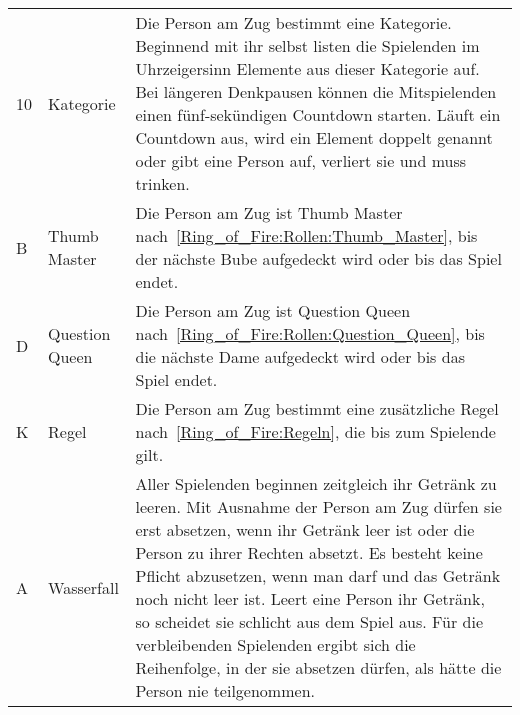 \begin{enumerate}[label={(\arabic*)}]
\begin{tabulary}{\textwidth}{llL}
		10 & Kategorie      & Die Person am Zug bestimmt eine Kategorie.
		Beginnend mit ihr selbst listen die Spielenden im Uhrzeigersinn Elemente aus dieser Kategorie auf.
		Bei längeren Denkpausen können die Mitspielenden einen fünf-sekündigen Countdown starten.
		Läuft ein Countdown aus, wird ein Element doppelt genannt oder gibt eine Person auf, verliert sie und muss trinken.                                                        \\[1ex]
		B  & Thumb Master   & Die Person am Zug ist Thumb Master nach~\ref{Ring_of_Fire:Rollen:Thumb_Master}, bis der nächste Bube aufgedeckt wird oder bis das Spiel endet.                                                         \\[1ex]
		D  & Question Queen & Die Person am Zug ist Question Queen nach~\ref{Ring_of_Fire:Rollen:Question_Queen}, bis die nächste Dame aufgedeckt wird oder bis das Spiel endet.                                                       \\[1ex]
		K  & Regel          & Die Person am Zug bestimmt eine zusätzliche Regel nach~\ref{Ring_of_Fire:Regeln}, die bis zum Spielende gilt.                                                                       \\[1ex]
		A  & Wasserfall     & Aller Spielenden beginnen zeitgleich ihr Getränk zu leeren.
		Mit Ausnahme der Person am Zug dürfen sie erst absetzen, wenn ihr Getränk leer ist oder die Person zu ihrer Rechten absetzt.
		Es besteht keine Pflicht abzusetzen, wenn man darf und das Getränk noch nicht leer ist.
		Leert eine Person ihr Getränk, so scheidet sie schlicht aus dem Spiel aus.
		Für die verbleibenden Spielenden ergibt sich die Reihenfolge, in der sie absetzen dürfen, als hätte die Person nie teilgenommen.                                           \\[1ex]
		\bottomrule
	\end{tabulary}
\end{enumerate}

